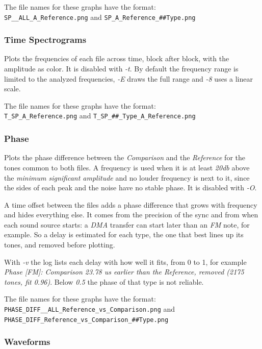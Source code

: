 \documentclass[10pt,a4paper]{report}
\newcommand{\db}[1]{\textit{\mbox{#1\acrshort{db}}}}
\begin{document}
\begin{appendices}
The file names for these graphs have the format:\\ \nolinkurl{SP__ALL_A_Reference.png} and \nolinkurl{SP_A_Reference_##Type.png}

\subsubsection{Time Spectrograms}

Plots the frequencies of each file across time, block after block, with the amplitude as color. It is disabled with \textit{-t}. By default the frequency range is limited to the analyzed frequencies, \textit{-E} draws the full range and \textit{-8} uses a linear scale.

The file names for these graphs have the format:\\ \nolinkurl{T_SP_A_Reference.png} and \nolinkurl{T_SP_##_Type_A_Reference.png}

\subsubsection{Phase}

Plots the phase difference between the \textit{Comparison} and the \textit{Reference} for the tones common to both files. A frequency is used when it is at least \db{20} above the \textit{minimum significant amplitude} and no louder frequency is next to it, since the sides of each peak and the noise have no stable phase. It is disabled with \textit{-O}.

A time offset between the files adds a phase difference that grows with frequency and hides everything else. It comes from the precision of the sync and from when each sound source starts: a \textit{DMA} transfer can start later than an \textit{FM} note, for example. So a delay is estimated for each type, the one that best lines up its tones, and removed before plotting.

With \textit{-v} the log lists each delay with how well it fits, from 0 to 1, for example \textit{Phase [FM]: Comparison 23.78 us earlier than the Reference, removed (2175 tones, fit 0.96)}. Below \textit{0.5} the phase of that type is not reliable.


The file names for these graphs have the format:\\ \nolinkurl{PHASE_DIFF__ALL_Reference_vs_Comparison.png} and \nolinkurl{PHASE_DIFF_Reference_vs_Comparison_##Type.png}

\subsubsection{Waveforms}


\end{appendices}
\end{document}
